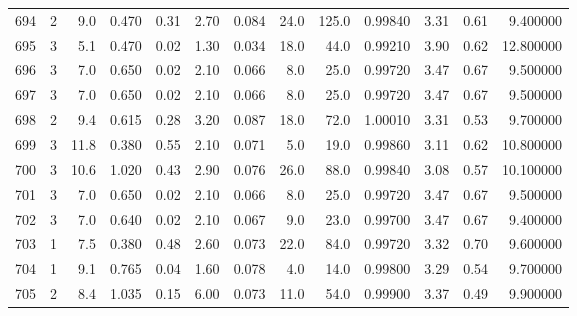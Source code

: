 \begin{tabular}{lrrrrrrrrrrrr}
694  &        2 &            9.0 &             0.470 &         0.31 &            2.70 &      0.084 &                 24.0 &                 125.0 &  0.99840 &  3.31 &       0.61 &   9.400000 \\
695  &        3 &            5.1 &             0.470 &         0.02 &            1.30 &      0.034 &                 18.0 &                  44.0 &  0.99210 &  3.90 &       0.62 &  12.800000 \\
696  &        3 &            7.0 &             0.650 &         0.02 &            2.10 &      0.066 &                  8.0 &                  25.0 &  0.99720 &  3.47 &       0.67 &   9.500000 \\
697  &        3 &            7.0 &             0.650 &         0.02 &            2.10 &      0.066 &                  8.0 &                  25.0 &  0.99720 &  3.47 &       0.67 &   9.500000 \\
698  &        2 &            9.4 &             0.615 &         0.28 &            3.20 &      0.087 &                 18.0 &                  72.0 &  1.00010 &  3.31 &       0.53 &   9.700000 \\
699  &        3 &           11.8 &             0.380 &         0.55 &            2.10 &      0.071 &                  5.0 &                  19.0 &  0.99860 &  3.11 &       0.62 &  10.800000 \\
700  &        3 &           10.6 &             1.020 &         0.43 &            2.90 &      0.076 &                 26.0 &                  88.0 &  0.99840 &  3.08 &       0.57 &  10.100000 \\
701  &        3 &            7.0 &             0.650 &         0.02 &            2.10 &      0.066 &                  8.0 &                  25.0 &  0.99720 &  3.47 &       0.67 &   9.500000 \\
702  &        3 &            7.0 &             0.640 &         0.02 &            2.10 &      0.067 &                  9.0 &                  23.0 &  0.99700 &  3.47 &       0.67 &   9.400000 \\
703  &        1 &            7.5 &             0.380 &         0.48 &            2.60 &      0.073 &                 22.0 &                  84.0 &  0.99720 &  3.32 &       0.70 &   9.600000 \\
704  &        1 &            9.1 &             0.765 &         0.04 &            1.60 &      0.078 &                  4.0 &                  14.0 &  0.99800 &  3.29 &       0.54 &   9.700000 \\
705  &        2 &            8.4 &             1.035 &         0.15 &            6.00 &      0.073 &                 11.0 &                  54.0 &  0.99900 &  3.37 &       0.49 &   9.900000 \\

\end{tabular}
